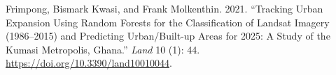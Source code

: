 \documentclass[
  letterpaper,
]{scrbook}
\newlength{\cslhangindent}
\newenvironment{CSLReferences}[2] %
 {\begin{list}{}{%
  \setlength{\itemindent}{0pt}
  \setlength{\leftmargin}{0pt}
  \setlength{\parsep}{0pt}
  \ifodd #1
   \setlength{\leftmargin}{\cslhangindent}
   \setlength{\itemindent}{-1\cslhangindent}
  \fi
  \setlength{\itemsep}{#2\baselineskip}}}
 {\end{list}}
\begin{document}
\label{refs}
\begin{CSLReferences}{1}{0}
Frimpong, Bismark Kwasi, and Frank Molkenthin. 2021. {``Tracking Urban
Expansion Using Random Forests for the Classification of Landsat Imagery
(1986--2015) and Predicting Urban/Built-up Areas for 2025: A Study of
the Kumasi Metropolis, Ghana.''} \emph{Land} 10 (1): 44.
\url{https://doi.org/10.3390/land10010044}.

\end{CSLReferences}


\backmatter
\end{document}
